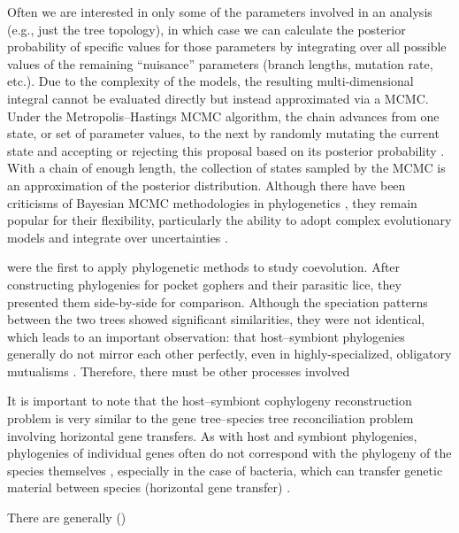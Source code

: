 \documentclass[12pt,letterpaper]{article}
\begin{document}
Often we are interested in only some of the parameters involved in an analysis (e.g., just the tree topology), in which case we can calculate the posterior probability of specific values for those parameters by integrating over all possible values of the remaining \enquote{nuisance} parameters (branch lengths, mutation rate, etc.). Due to the complexity of the models, the resulting multi-dimensional integral cannot be evaluated directly but instead approximated via a \ac{MCMC}. Under the Metropolis--Hastings \ac{MCMC} algorithm, the chain advances from one state, or set of parameter values, to the next by randomly mutating the current state and accepting or rejecting this proposal based on its posterior probability \parencites{Metropolis:1953}{Hastings:1970}. With a chain of enough length, the collection of states sampled by the \ac{MCMC} is an approximation of the posterior distribution. Although there have been criticisms of Bayesian \ac{MCMC} methodologies in phylogenetics \parencites{Felsenstein:2005}{Kolaczkowski:2009}, they remain popular for their flexibility, particularly the ability to adopt complex evolutionary models and integrate over uncertainties \parencites{Huelsenbeck:2000}{Drummond:2007}{Ronquist:2012}.

\textcite{Haffner:1988} were the first to apply phylogenetic methods to study coevolution. After constructing phylogenies for pocket gophers and their parasitic lice, they presented them side-by-side for comparison. Although the speciation patterns between the two trees showed significant similarities, they were not identical, which leads to an important observation: that host--symbiont phylogenies generally do not mirror each other perfectly, even in highly-specialized, obligatory mutualisms \parencite{Machado:2005}. Therefore, there must be other processes involved

It is important to note that the host--symbiont cophylogeny reconstruction problem is very similar to the gene tree--species tree reconciliation problem involving horizontal gene transfers. As with host and symbiont phylogenies, phylogenies of individual genes often do not correspond with the phylogeny of the species themselves \parencite{Heled:2010a}, especially in the case of bacteria, which can transfer genetic material between species (horizontal gene transfer) \parencite{David:2011}.



There are generally ()
\end{document}
